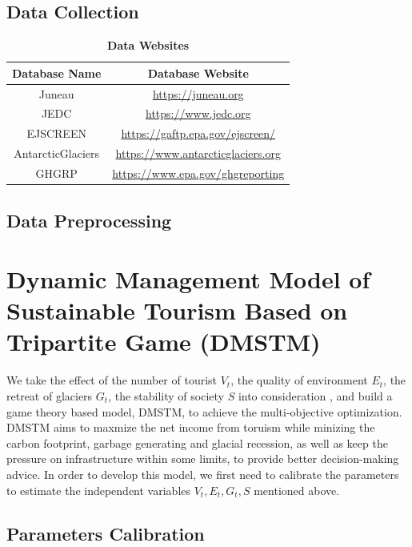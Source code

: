 \documentclass{mcmthesis}
\begin{document}
\subsection{Data Collection}
\begin{table}[H]
  \caption{\textbf{Data Websites}} 
  \centering
  \begin{tabular}{cc}
    \toprule 
      Database Name & Database Website \\
    \midrule
      Juneau & \href{https://juneau.org}{https://juneau.org} \\ 
      JEDC & \href{https://www.jedc.org}{https://www.jedc.org} \\
      EJSCREEN & \href{https://gaftp.epa.gov/ejscreen/}{https://gaftp.epa.gov/ejscreen/} \\ 
      AntarcticGlaciers & \href{https://www.antarcticglaciers.org}{https://www.antarcticglaciers.org} \\
      GHGRP & \href{https://www.epa.gov/ghgreporting}{https://www.epa.gov/ghgreporting} \\
    \bottomrule
  \end{tabular}
\end{table}

\subsection{Data Preprocessing}

\section{Dynamic Management Model of Sustainable Tourism Based on Tripartite Game (DMSTM)}
We take the effect of the number of tourist $V_t$, the quality of environment $E_t$, 
the retreat of glaciers $G_t$, the stability of society $S$ into consideration , 
and build a game theory based model\cite{Wang2021}, DMSTM, to achieve the multi-objective optimization.
DMSTM aims to maxmize the net income from toruism while minizing the carbon footprint,
garbage generating and glacial recession, as well as keep the pressure on infrastructure within some limits,
to provide better decision-making advice.
In order to develop this model, we first need to calibrate the parameters to estimate 
the independent variables $V_t, E_t, G_t, S$ mentioned above.

\subsection{Parameters Calibration}
\end{document}
